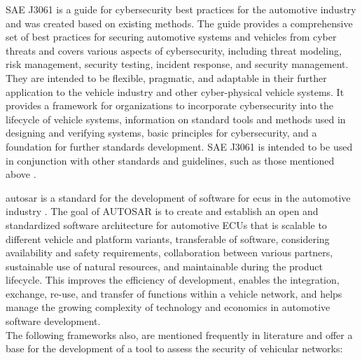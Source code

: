 SAE J3061 is a guide for cybersecurity best practices for the automotive industry and was created based on existing methods. 
The guide provides a comprehensive set of best practices for securing automotive systems and vehicles from cyber threats and covers various aspects of cybersecurity, including threat modeling, risk management, security testing, incident response, and security management.
They are intended to be flexible, pragmatic, and adaptable in their further application to the vehicle industry and other cyber-physical vehicle systems. 
It provides a framework for organizations to incorporate cybersecurity into the lifecycle of vehicle systems, information on standard tools and methods used in designing and verifying systems, basic principles for cybersecurity, and a foundation for further standards development. 
SAE J3061 is intended to be used in conjunction with other standards and guidelines, such as those mentioned above \cite{sae_j3061}. 

\gls{autosar} is a standard for the development of software for \gls{ecu}s in the automotive industry \cite{autosar}.
The goal of AUTOSAR is to create and establish an open and standardized software architecture for automotive ECUs that is scalable to different vehicle and platform variants, 
transferable of software, considering availability and safety requirements, collaboration between various partners, sustainable use of natural resources, 
and maintainable during the product lifecycle. 
This improves the efficiency of development, enables the integration, exchange, re-use, and transfer of functions within a vehicle network, 
and helps manage the growing complexity of technology and economics in automotive software development.\\

The following frameworks also, are mentioned frequently in literature and offer a base for the development of a tool to assess the security of vehicular networks:

